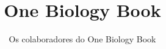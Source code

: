 \documentclass[11pt,a4paper,twoside,openany]{book}
\title{One Biology Book}
\author{Os colaboradores do One Biology Book}
\date{\bookdate}
\begin{document}
\frontmatter




\tableofcontents

\mainmatter





\appendix
\part{\omsolutionspart}




\backmatter
\renewcommand{\indexspace}{\par\vskip 8pt plus 4pt minus 4pt\relax}
\printindex
\end{document}
